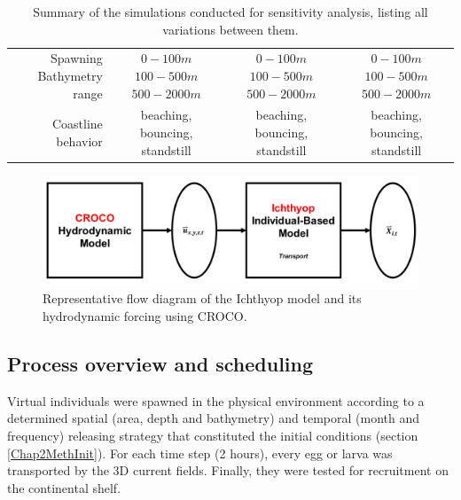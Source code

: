 \begin{landscape}
\begin{table}[H]
\begin{tabular}{r|c|c|c}
Spawning Bathymetry range  &
	\makecell{$0-100 m$ \\ $100-500 m$ \\ $500-2000 m$}&
	\makecell{$0-100 m$ \\ $100-500 m$ \\ $500-2000 m$}&
	\makecell{$0-100 m$ \\ $100-500 m$ \\ $500-2000 m$}\\
Coastline behavior								&
	\makecell{beaching,\\bouncing,\\standstill}&
	\makecell{beaching,\\bouncing,\\standstill}&
	\makecell{beaching,\\bouncing,\\standstill}\\
\hline
\end{tabular}
\caption{Summary of the simulations conducted for sensitivity analysis, listing all variations between them.}
\label{TabSimus}
\end{table}
\end{landscape}

\begin{figure}[H]
	\includegraphics[width=1.0\textwidth]{figures/Chap2Ichthyop.png}
	\centering
	\caption{Representative flow diagram of the Ichthyop model and its hydrodynamic forcing using CROCO.}
	\label{Chap2Ichthyop}
\end{figure}

\subsection{Process overview and scheduling}\label{Chap2MethProc}

Virtual individuals were spawned in the physical environment according to a determined spatial (area, depth and bathymetry) and temporal (month and frequency) releasing strategy that constituted the initial conditions (section \ref{Chap2MethInit}). For each time step (2 hours), every egg or larva was transported by the 3D current fields. Finally, they were tested for recruitment on the continental shelf.\\


